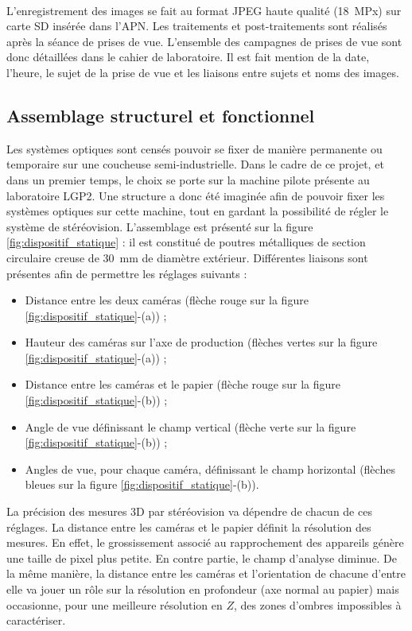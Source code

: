 \documentclass[a4paper, 11pt]{article}
\begin{document}
		\\L'enregistrement des images se fait au format JPEG haute qualité (\num{18}~MPx) sur carte SD insérée dans l'APN. Les traitements et post-traitements sont réalisés après la séance de prises de vue. L'ensemble des campagnes de prises de vue sont donc détaillées dans le cahier de laboratoire. Il est fait mention de la date, l'heure, le sujet de la prise de vue et les liaisons entre sujets et noms des images.
	
	\subsection{Assemblage structurel et fonctionnel}
		Les systèmes optiques sont censés pouvoir se fixer de manière permanente ou temporaire sur une coucheuse semi-industrielle. Dans le cadre de ce projet, et dans un premier temps, le choix se porte sur la machine pilote présente au laboratoire LGP2. Une structure a donc été imaginée afin de pouvoir fixer les systèmes optiques sur cette machine, tout en gardant la possibilité de régler le système de stéréovision. L'assemblage est présenté sur la figure \ref{fig:dispositif_statique} : il est constitué de poutres métalliques de section circulaire creuse de \SI{30}{\milli\meter} de diamètre extérieur. Différentes liaisons sont présentes afin de permettre les réglages suivants :
		\begin{itemize}
			\item Distance entre les deux caméras (flèche rouge sur la figure \ref{fig:dispositif_statique}-(a)) ;
			\item Hauteur des caméras sur l'axe de production (flèches vertes sur la figure \ref{fig:dispositif_statique}-(a)) ;
			\item Distance entre les caméras et le papier (flèche rouge sur la figure \ref{fig:dispositif_statique}-(b)) ;
			\item Angle de vue définissant le champ vertical (flèche verte sur la figure \ref{fig:dispositif_statique}-(b)) ;
			\item Angles de vue, pour chaque caméra, définissant le champ horizontal (flèches bleues sur la figure \ref{fig:dispositif_statique}-(b)).
		\end{itemize}
		La précision des mesures 3D par stéréovision va dépendre de chacun de ces réglages. La distance entre les caméras et le papier définit la résolution des mesures. En effet, le grossissement associé au rapprochement des appareils génère une taille de pixel plus petite. En contre partie, le champ d'analyse diminue. De la même manière, la distance entre les caméras et l'orientation de chacune d'entre elle va jouer un rôle sur la résolution en profondeur (axe normal au papier) mais occasionne, pour une meilleure résolution en $Z$, des zones d'ombres impossibles à caractériser.
\end{document}
